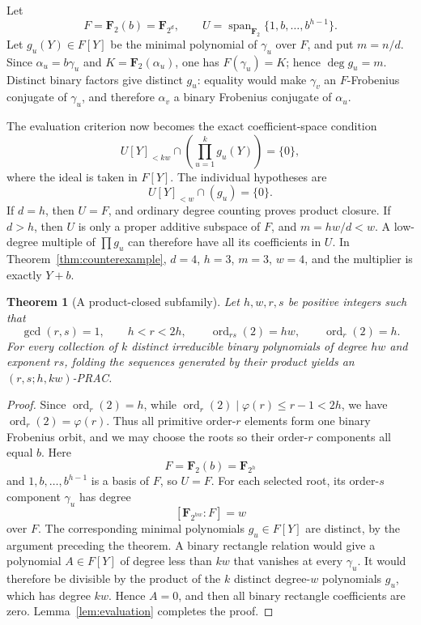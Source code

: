 \documentclass[11pt]{article}
\newtheorem{theorem}{Theorem}
\newcommand{\F}{\mathbf F}
\newcommand{\ord}{\operatorname{ord}}
\begin{document}
Let
\[
 F=\F_2(b)=\F_{2^d},\qquad
 U=\operatorname{span}_{\F_2}\{1,b,\ldots,b^{h-1}\}.
\]
Let \(g_u(Y)\in F[Y]\) be the minimal polynomial of \(\gamma_u\) over
\(F\), and put \(m=n/d\).  Since
\(\alpha_u=b\gamma_u\) and \(K=\F_2(\alpha_u)\), one has
\(F(\gamma_u)=K\); hence \(\deg g_u=m\).
Distinct binary factors give distinct \(g_u\): equality would make
\(\gamma_v\) an \(F\)-Frobenius conjugate of \(\gamma_u\), and therefore
\(\alpha_v\) a binary Frobenius conjugate of \(\alpha_u\).

The evaluation criterion now becomes the exact coefficient-space condition
\[
 U[Y]_{<kw}\cap
 \left(\prod_{u=1}^k g_u(Y)\right)=\{0\},
\]
where the ideal is taken in \(F[Y]\).  The individual hypotheses are
\[
 U[Y]_{<w}\cap(g_u)=\{0\}.
\]
If \(d=h\), then \(U=F\), and ordinary degree counting proves product
closure.  If \(d>h\), then \(U\) is only a proper additive subspace of
\(F\), and \(m=hw/d<w\).  A low-degree multiple of
\(\prod g_u\) can therefore have all its coefficients in \(U\).
In Theorem~\ref{thm:counterexample}, \(d=4\), \(h=3\), \(m=3\), \(w=4\),
and the multiplier is exactly \(Y+b\).

\begin{theorem}[A product-closed subfamily]
\label{thm:subfamily}
Let \(h,w,r,s\) be positive integers such that
\[
 \gcd(r,s)=1,\qquad h<r<2h,\qquad
 \ord_{rs}(2)=hw,\qquad \ord_r(2)=h.
\]
For every collection of \(k\) distinct irreducible binary polynomials of
degree \(hw\) and exponent \(rs\), folding the sequences generated by their
product yields an \((r,s;h,kw)\)-PRAC.
\end{theorem}

\begin{proof}
Since \(\ord_r(2)=h\), while
\(\ord_r(2)\mid\varphi(r)\leq r-1<2h\), we have
\(\ord_r(2)=\varphi(r)\).  Thus all primitive order-\(r\) elements form one
binary Frobenius orbit, and we may choose the roots so their order-\(r\)
components all equal \(b\).  Here
\[
 F=\F_2(b)=\F_{2^h}
\]
and \(1,b,\ldots,b^{h-1}\) is a basis of \(F\), so \(U=F\).
For each selected root, its order-\(s\) component \(\gamma_u\) has degree
\[
 [\F_{2^{hw}}:F]=w
\]
over \(F\).  The corresponding minimal polynomials \(g_u\in F[Y]\) are
distinct, by the argument preceding the theorem.  A binary rectangle
relation would give a polynomial \(A\in F[Y]\) of degree less than \(kw\)
that vanishes at every \(\gamma_u\).  It would therefore be divisible by
the product of the \(k\) distinct degree-\(w\) polynomials \(g_u\), which
has degree \(kw\).  Hence \(A=0\), and then all binary rectangle
coefficients are zero.  Lemma~\ref{lem:evaluation} completes the proof.
\end{proof}
\end{document}
